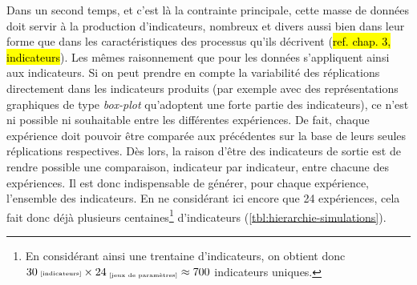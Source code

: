 	Dans un second temps, et c'est là la contrainte principale, cette masse de données doit servir à la production d'indicateurs, nombreux et divers aussi bien dans leur forme que dans les caractéristiques des processus qu'ils décrivent (\hl{ref. chap. 3, indicateurs}).
	Les mêmes raisonnement que pour les données s'appliquent ainsi aux indicateurs.
	Si on peut prendre en compte la variabilité des réplications directement dans les indicateurs produits (par exemple avec des représentations graphiques de type \textit{box-plot} qu'adoptent une forte partie des indicateurs), ce n'est ni possible ni souhaitable entre les différentes expériences.
	De fait, chaque expérience doit pouvoir être comparée aux précédentes sur la base de leurs seules réplications respectives.
	Dès lors, la raison d'être des indicateurs de sortie est de rendre possible une comparaison, indicateur par indicateur, entre chacune des expériences. 
	Il est donc indispensable de générer, pour chaque expérience, l'ensemble des indicateurs. En ne considérant ici encore que 24 expériences, cela fait donc déjà plusieurs centaines\footnote{
	En considérant ainsi une trentaine d'indicateurs, on obtient donc $30{\text{\tiny ~[indicateurs]}} \times 24_{\text{\tiny ~[jeux de paramètres]}} \approx 700$ indicateurs uniques.
	} d'indicateurs (\cref{tbl:hierarchie-simulations}).


